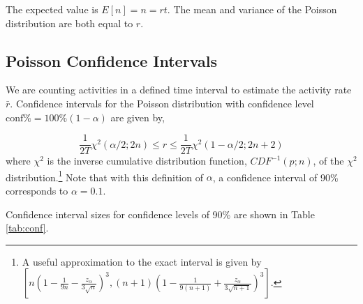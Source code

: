 \documentclass{article}
\begin{document}
The expected value is $E[n]=n=rt$. The mean and variance of the Poisson distribution are both equal to $r$.

\subsection{Poisson Confidence Intervals} 

We 
\reversemarginpar\marginpar{\raggedleft
%
    \begin{tikzpicture}[scale=0.26]]
\draw [red, very thick, rotate around={0: (0, 0)}] (-0.7, -0.7) rectangle(3.7, 0.7);
%
\draw [very thick, <->] (0.25000000000000006, 0.4330127018922193) -- (1.25, 2.165063509461097) ;
\draw [very thick, <->] (1.75, 2.165063509461097) -- (2.75, 0.4330127018922193) ;
\draw [very thick, <->] (2.5, 0) -- (0.5, 0) ;
%
\draw [orange, ultra thick] (0,0) circle [radius= 0.5 ];
\draw [yellow, ultra thick] ( 1.5 , 2.59807621135 ) circle [radius= 0.5 ];
\draw [green,  ultra thick] ( 3.0 , 0 ) circle [radius= 0.5 ];
    \end{tikzpicture}
%
%
}
are counting activities in a defined time interval to estimate the activity rate $\bar{r}$. Confidence intervals \cite{George:2012} for the
Poisson distribution with confidence level $\text{conf\%} = 100\%(1-\alpha)$ are given by,

\begin{equation}
    \label{eq:chisqconf}
    \frac{1}{2T} \chi^2(\alpha/2;2n) \leq r \leq \frac{1}{2T} \chi^2(1-\alpha/2;2n+2)
\end{equation}
where $\chi^2$ is the inverse cumulative distribution function, $CDF^{-1}(p; n)$, of the $\chi^2$ distribution.\footnote{A useful approximation to the exact interval is given by  $[ n(1 - \frac{1}{9n} - \frac{z_{\alpha}}{3\sqrt{n}})^3 , (n+1)(1- \frac{1}{9(n+1)} + \frac{z_{\alpha}}{3\sqrt{n+1}})^3]$. }
Note that with this definition of $\alpha$, a confidence interval of 90\% corresponds to $\alpha=0.1$.

Confidence interval sizes for confidence levels of 90\% are shown in Table \ref{tab:conf}.
\end{document}
